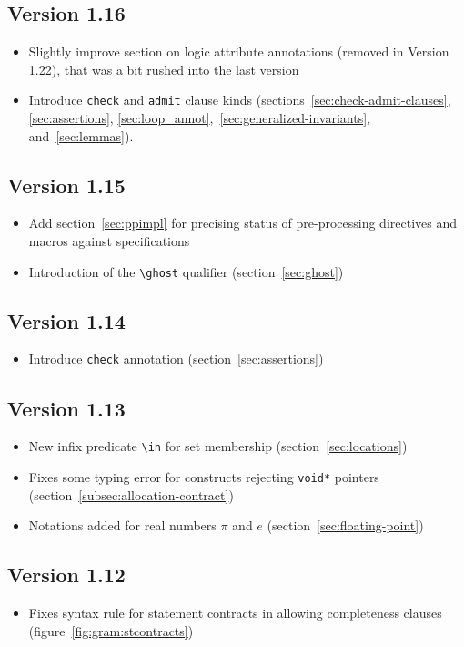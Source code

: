 \subsection{Version 1.16}
\begin{itemize}
\item Slightly improve section on logic attribute annotations
(removed in Version 1.22), that was a bit rushed into
the last version
\item Introduce \lstinline|check| and \lstinline|admit| clause kinds
(sections~\ref{sec:check-admit-clauses}, \ref{sec:assertions},
\ref{sec:loop_annot},~\ref{sec:generalized-invariants}, and~\ref{sec:lemmas}).
\end{itemize}
\subsection{Version 1.15}
\begin{itemize}
\item Add section~\ref{sec:ppimpl} for precising status of pre-processing
  directives and macros against specifications
\item Introduction of the \lstinline|\ghost| qualifier (section~\ref{sec:ghost})
\end{itemize}
\subsection{Version 1.14} %
\begin{itemize}
\item Introduce \lstinline|check| annotation (section~\ref{sec:assertions})
\end{itemize}

\subsection{Version 1.13} %
\begin{itemize}
\item New infix predicate \lstinline|\in| for set membership
  (section~\ref{sec:locations})
\item Fixes some typing error for constructs rejecting
  \lstinline|void*| pointers (section~\ref{subsec:allocation-contract})
\item Notations added for real numbers $\pi$ and $e$
  (section~\ref{sec:floating-point})
\end{itemize}

\subsection{Version 1.12} %
\begin{itemize}
\item Fixes syntax rule for statement contracts in allowing completeness clauses
  (figure~\ref{fig:gram:stcontracts})
\end{itemize}

